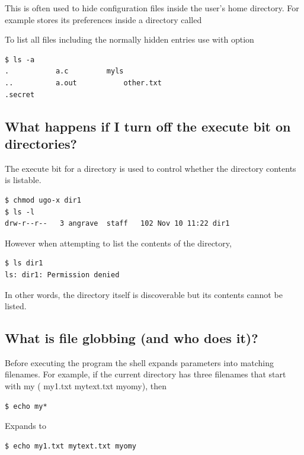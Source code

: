 This is often used to hide configuration files inside the user's home directory. For example  stores its preferences inside a directory called 

To list all files including the normally hidden entries use  with  option

\begin{lstlisting}
$ ls -a
.           a.c         myls
..          a.out           other.txt
.secret 
\end{lstlisting}

\subsection{What happens if I turn off the execute bit on directories?}\label{what-happens-if-i-turn-off-the-execute-bit-on-directories}

The execute bit for a directory is used to control whether the directory contents is listable.

\begin{lstlisting}
$ chmod ugo-x dir1
$ ls -l
drw-r--r--   3 angrave  staff   102 Nov 10 11:22 dir1
\end{lstlisting}

However when attempting to list the contents of the directory,

\begin{lstlisting}
$ ls dir1
ls: dir1: Permission denied
\end{lstlisting}

In other words, the directory itself is discoverable but its contents cannot be listed.

\subsection{What is file globbing (and who does it)?}\label{what-is-file-globbing-and-who-does-it}

Before executing the program the shell expands parameters into matching filenames. For example, if the current directory has three filenames that start with my ( my1.txt mytext.txt myomy), then

\begin{lstlisting}
$ echo my*
\end{lstlisting}

Expands to

\begin{lstlisting}
$ echo my1.txt mytext.txt myomy
\end{lstlisting}

